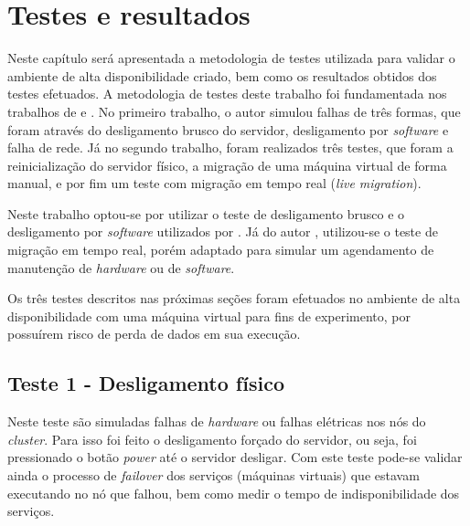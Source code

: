 \chapter{Testes e resultados}
\label{cap:resultados}

Neste capítulo será apresentada a metodologia de testes utilizada para validar o ambiente de alta disponibilidade criado, bem como os
resultados obtidos dos testes efetuados.
A metodologia de testes deste trabalho foi fundamentada nos trabalhos de \citet{reis2009} e \citet{goncalves2009}. No primeiro trabalho, 
o autor simulou falhas de três formas, que foram através do desligamento brusco do servidor, desligamento por \textit{software} e falha de rede. 
Já no segundo trabalho, foram realizados três testes, que foram a reinicialização do servidor físico, a migração de uma máquina virtual de forma
manual, e por fim um teste com migração em tempo real (\textit{live migration}).

Neste trabalho optou-se por utilizar o teste de desligamento brusco e o desligamento por \textit{software} utilizados por \citet{reis2009}.
Já do autor \citet{goncalves2009}, utilizou-se o teste de migração em tempo real, porém adaptado para simular um agendamento de manutenção de 
\textit{hardware} ou de \textit{software}.

Os três testes descritos nas próximas seções foram efetuados no ambiente de alta disponibilidade com uma máquina virtual para fins de experimento, 
por possuírem risco de perda de dados em sua execução.

\section{Teste 1 - Desligamento físico}

Neste teste são simuladas falhas de \textit{hardware} ou falhas elétricas nos nós do \textit{cluster}. Para isso foi feito o desligamento 
forçado do servidor, ou seja, foi pressionado o botão \textit{power} até o servidor desligar.
Com este teste pode-se validar ainda o processo de \textit{failover} dos serviços (máquinas virtuais) que estavam executando no nó que falhou, 
bem como medir o tempo de indisponibilidade dos serviços. 

